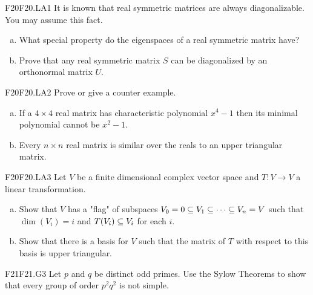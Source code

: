 \documentclass[../AlgebraQualSolutions.tex]{subfiles}
\begin{document}
\begin{prob}{F20}{F20.LA1}
It is known that real symmetric matrices are always diagonalizable. You may assume this fact.
\begin{enumerate}[(a)]
\item What special property do the eigenspaces of a real symmetric matrix have?
\item Prove that any real symmetric matrix $S$ can be diagonalized by an orthonormal matrix $U$.
\end{enumerate}
\end{prob}

\begin{prob}{F20}{F20.LA2}
Prove or give a counter example.
\begin{enumerate}[(a)]
\item If a $4 \times 4$ real matrix has characteristic polynomial $x^4 -1$ then its minimal polynomial cannot be $x^2 - 1$.
\item Every $n \times n$ real matrix is similar over the reals to an upper triangular matrix.
\end{enumerate}
\end{prob}

\begin{prob}{F20}{F20.LA3}
Let $V$ be a finite dimensional complex vector space and $T: V \to V$ a linear transformation.
\begin{enumerate}[(a)]
\item Show that $V$ has a "flag" of subspaces $V_0 = 0 \subseteq V_1 \subseteq \cdots \subseteq V_n = V$ such that $\dim(V_i) = i$ and $T(V_i) \subseteq V_i$ for each $i$.
\item Show that there is a basis for $V$ such that the matrix of $T$ with respect to this basis is upper triangular.
\end{enumerate}
\end{prob}



\begin{prob}{F21}{F21.G3}
Let $p$ and $q$ be distinct odd primes. Use the Sylow Theorems to show that every group of order $p^2q^2$ is not simple.
\end{prob}	
\end{document}
